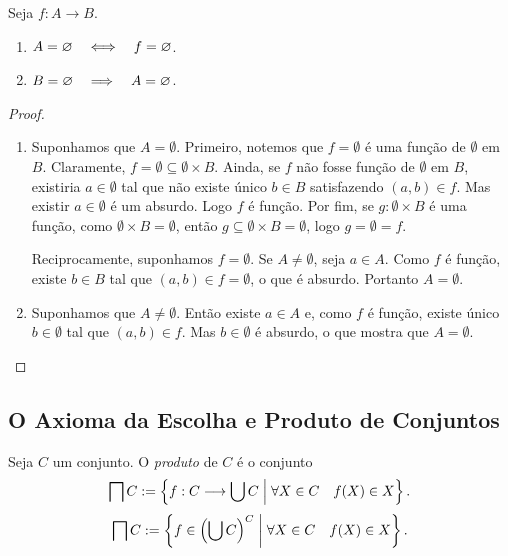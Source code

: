 \begin{prop}
	Seja $f: A \to B$.
	\begin{enumerate}
	\item $A=\varnothing \quad \Longleftrightarrow \quad f=\varnothing$.
	\item $B=\varnothing \quad \Longrightarrow \quad A=\varnothing$.
	\end{enumerate}
\end{prop}
\begin{proof}
	\begin{enumerate}
	\item Suponhamos que $A=\emptyset$. Primeiro, notemos que $f=\emptyset$ é uma função de $\emptyset$ em $B$. Claramente, $f = \emptyset \subseteq \emptyset \times B$. Ainda, se $f$ não fosse função de $\emptyset$ em $B$, existiria $a \in \emptyset$ tal que não existe único $b \in B$ satisfazendo $(a,b) \in f$. Mas existir $a \in \emptyset$ é um absurdo. Logo $f$ é função. Por fim, se $g: \emptyset \times B$ é uma função, como $\emptyset \times B = \emptyset$, então $g \subseteq \emptyset \times B = \emptyset$, logo $g=\emptyset=f$.
	
	Reciprocamente, suponhamos $f=\emptyset$. Se $A \neq \emptyset$, seja $a \in A$. Como $f$ é função, existe $b \in B$ tal que $(a,b) \in f=\emptyset$, o que é absurdo. Portanto $A=\emptyset$.
	
	\item Suponhamos que $A \neq \emptyset$. Então existe $a \in A$ e, como $f$ é função, existe único $b \in \emptyset$ tal que $(a,b) \in f$. Mas $b \in \emptyset$ é absurdo, o que mostra que $A = \emptyset$.
	\end{enumerate}
\end{proof}

\subsection*{O Axioma da Escolha e Produto de Conjuntos}

\begin{defi}
Seja $C$ um conjunto. O \emph{produto} de $C$ é o conjunto
	\begin{equation*}
	\prod C := \set{f: C \to \bigcup C }{\forall X \in C \quad f(X) \in X}.
	\end{equation*}
	\begin{equation*}
	\prod C := \set{f \in \left(\bigcup C\right)^C }{\forall X \in C \quad f(X) \in X}.
	\end{equation*}
\end{defi}

